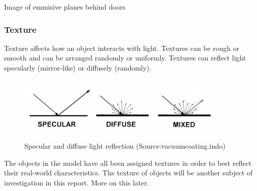 \documentclass[11pt,a4paper]{report}
\begin{document}
					{{Image of emmisive planes behind doors}}
			\subsubsection{Texture}
				Texture affects how an object interacts with light. Textures can be rough or smooth and can be arranged randomly or uniformly. Textures can reflect light specularly (mirror-like) or diffusely (randomly).
				\begin{figure}[h!]
					\centering
					\includegraphics[width=0.9\textwidth]{light_reflection}
					\caption{Specular and diffuse light reflection (Source:vacuumcoating.indo)}
					\label{fig:light_reflection}
				\end{figure}
				The objects in the model have all been assigned textures in order to best reflect their real-world characteristics. The texture of objects will be another subject of investigation in this report. More on this later.
				
\end{document}

